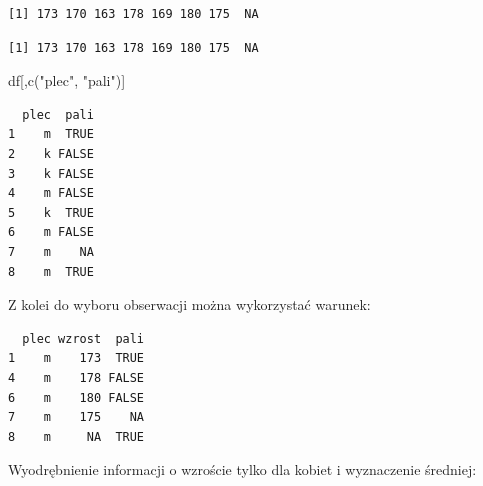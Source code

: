 \documentclass[
  letterpaper,
  DIV=11,
  numbers=noendperiod]{scrreprt}
\newenvironment{Shaded}{\begin{snugshade}}{\end{snugshade}}
\newcommand{\CommentTok}[1]{\textcolor[rgb]{0.37,0.37,0.37}{#1}}
\newcommand{\FunctionTok}[1]{\textcolor[rgb]{0.28,0.35,0.67}{#1}}
\newcommand{\NormalTok}[1]{\textcolor[rgb]{0.00,0.23,0.31}{#1}}
\newcommand{\OtherTok}[1]{\textcolor[rgb]{0.00,0.23,0.31}{#1}}
\newcommand{\SpecialCharTok}[1]{\textcolor[rgb]{0.37,0.37,0.37}{#1}}
\newcommand{\StringTok}[1]{\textcolor[rgb]{0.13,0.47,0.30}{#1}}
\begin{document}
\begin{verbatim}
[1] 173 170 163 178 169 180 175  NA
\end{verbatim}

\begin{Shaded}
\end{Shaded}

\begin{verbatim}
[1] 173 170 163 178 169 180 175  NA
\end{verbatim}

\begin{Shaded}
\begin{Highlighting}[]
\NormalTok{df[,}\FunctionTok{c}\NormalTok{(}\StringTok{"plec"}\NormalTok{, }\StringTok{"pali"}\NormalTok{)]}
\end{Highlighting}
\end{Shaded}

\begin{verbatim}
  plec  pali
1    m  TRUE
2    k FALSE
3    k FALSE
4    m FALSE
5    k  TRUE
6    m FALSE
7    m    NA
8    m  TRUE
\end{verbatim}

Z kolei do wyboru obserwacji można wykorzystać warunek:

\begin{Shaded}
\end{Shaded}

\begin{verbatim}
  plec wzrost  pali
1    m    173  TRUE
4    m    178 FALSE
6    m    180 FALSE
7    m    175    NA
8    m     NA  TRUE
\end{verbatim}

Wyodrębnienie informacji o wzroście tylko dla kobiet i wyznaczenie
średniej:

\begin{Shaded}
\end{Shaded}
\end{document}
